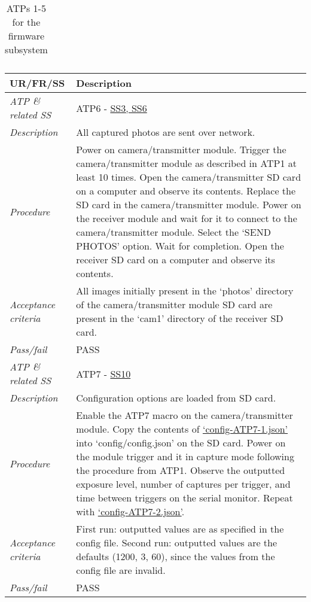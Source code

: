 \documentclass[class=report,11pt,crop=false]{standalone}
\begin{document}
\begin{table}[!ht]
\begin{scriptsize}
\begin{tabularx}{\textwidth}{|p{} X|}
        

    \end{tabularx}
    \end{scriptsize}
    \caption{ATPs 1-5 for the firmware subsystem}
    \label{tab:firmware-atps1}
\end{table}

\begin{table}[!ht]
    \centering
    \begin{scriptsize}
    \begin{tabularx}{\textwidth}{|p{} X|}
        
        \hline
        \textbf{UR/FR/SS} & \textbf{Description}\\ \hline



        \textit{ATP \& related SS} & ATP6 - \hyperlink{tab:firmware-requirements}{SS3, SS6}\\
        \textit{Description} & All captured photos are sent over network. \\
        \textit{Procedure} & Power on camera/transmitter module. Trigger the camera/transmitter module as described in ATP1 at least 10 times. Open the camera/transmitter SD card on a computer and observe its contents. Replace the SD card in the camera/transmitter module. Power on the receiver module and wait for it to connect to the camera/transmitter module. Select the `SEND PHOTOS' option. Wait for completion. Open the receiver SD card on a computer and observe its contents.\\
        \textit{Acceptance criteria} & All images initially present in the `photos' directory of the camera/transmitter module SD card are present in the `cam1' directory of the receiver SD card.\\ 
        \textit{Pass/fail} & PASS \\ \hline

        \textit{ATP \& related SS} & ATP7 - \hyperlink{tab:firmware-requirements}{SS10} \\
        \textit{Description} & Configuration options are loaded from SD card.\\
        \textit{Procedure} & Enable the ATP7 macro on the camera/transmitter module. Copy the contents of \href{https://github.com/rothdu/EEE4113F-Group13-2024/blob/main/firmware/json-samples/config-ATP8-1.json}{`config-ATP7-1.json'} into `config/config.json' on the SD card. Power on the module trigger and it in capture mode following the procedure from ATP1. Observe the outputted exposure level, number of captures per trigger, and time between triggers on the serial monitor. Repeat with \href{https://github.com/rothdu/EEE4113F-Group13-2024/blob/main/firmware/json-samples/config-ATP7-2.json}{`config-ATP7-2.json'}. \\
        \textit{Acceptance criteria} & First run: outputted values are as specified in the config file. Second run: outputted values are the defaults (1200, 3, 60), since the values from the config file are invalid.\\ 
        \textit{Pass/fail} & PASS\\ \hline


\end{tabularx}
\end{scriptsize}
\end{table}
\end{document}

